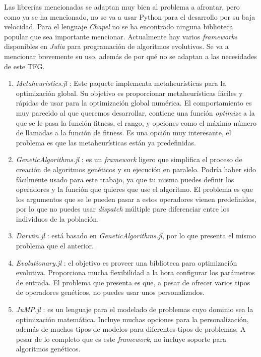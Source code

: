 Las librerías mencionadas se adaptan muy bien al problema a afrontar, pero como ya se ha mencionado, no se va a usar Python para el desarrollo por su baja
velocidad. Para el lenguaje \emph{Chapel} no se ha encontrado ninguna biblioteca popular que sea importante mencionar. Actualmente hay varios
\emph{frameworks} disponibles en \emph{Julia} para programación de algoritmos evolutivos. Se va a mencionar brevemente su uso, además de por qué no
se adaptan a las necesidades de este TFG.

\begin{enumerate}
    \item \emph{Metaheuristics.jl} \cite{metaheuristics_jl}: Este paquete implementa metaheurísticas para la optimización global. Su objetivo es proporcionar metaheurísticas
    fáciles y rápidas de usar para la optimización global numérica. El comportamiento es muy parecido al que queremos desarrollar, contiene una función \emph{optimize}
    a la que se le pasa la función fitness, el rango, y opciones como el máximo número de llamadas a la función de fitness. Es una opción muy interesante, el problema es que las
    metaheurísticas están ya predefinidas.
    \item \emph{GeneticAlgorithms.jl} \cite{GeneticAlgorithms_jl}: es un \emph{framework} ligero que simplifica el proceso de creación de algoritmos genéticos y su ejecución en
    paralelo. Podría haber sido fácilmente usado para este trabajo, ya que tu misma puedes definir los operadores y la función que quieres que use el algoritmo. El problema es
    que los argumentos que se le pueden pasar a estos operadores vienen predefinidos, por lo que no puedes usar \emph{dispatch} múltiple pare diferenciar entre los individuos de 
    la población.
    \item \emph{Darwin.jl} \cite{darwin_jl}: está basado en \emph{GeneticAlgorithms.jl}, por lo que presenta el mismo problema que el anterior.
    \item \emph{Evolutionary.jl} \cite{evolutionary_jl}: el objetivo es proveer una biblioteca para optimización evolutiva. Proporciona mucha flexibilidad a la hora configurar los parámetros
    de entrada. El problema que presenta es que, a pesar de ofrecer varios tipos de operadores genéticos, no puedes usar unos personalizados.
    \item \emph{JuMP.jl} \cite{DunningHuchetteLubin2017}: es un lenguaje para el modelado de problemas cuyo dominio sea la optimización matemática. Incluye muchas opciones para la personalización,
    además de muchos tipos de modelos para diferentes tipos de problemas. A pesar de lo completo que es este \emph{framework}, no incluye soporte para algoritmos genéticos.
\end{enumerate}

